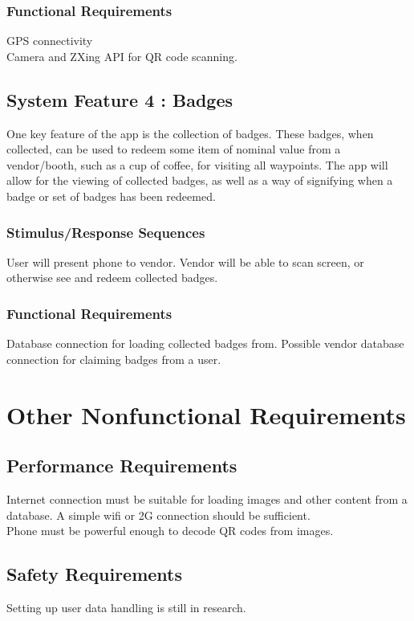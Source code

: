 \documentclass{scrreprt}
\begin{document}
\subsection{Functional Requirements}
GPS connectivity \\
Camera and ZXing API for QR code scanning.

\section{System Feature 4 : Badges}
One key feature of the app is the collection of badges. These badges, when collected,
can be used to redeem some item of nominal value from a vendor/booth, such as a 
cup of coffee, for visiting all waypoints. The app will allow for the viewing of collected 
badges, as well as a way of signifying when a badge or set of badges has been redeemed.

\subsection{Stimulus/Response Sequences}
User will present phone to vendor. Vendor will be able to scan screen, or otherwise 
see and redeem collected badges.

\subsection{Functional Requirements}
Database connection for loading collected badges from. Possible vendor database connection 
for claiming badges from a user.


\chapter{Other Nonfunctional Requirements}

\section{Performance Requirements}
Internet connection must be suitable for loading images and other content from a 
database. A simple wifi or 2G connection should be sufficient. \\
Phone must be powerful enough to decode QR codes from images.

\section{Safety Requirements}
Setting up user data handling is still in research.
\end{document}
